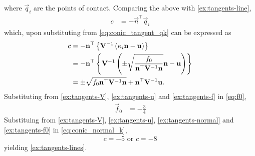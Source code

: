     where $\vec{q}_i$ are the points of contact.  Comparing the above with 
\eqref{ex:tangents-line},
    \begin{align}
	    c &= -\vec{n}^{\top} \vec{q}_i 
	    \label{ex:tangents-c}
    \end{align}
    which, upon substituting from 
\eqref{eq:conic_tangent_qk} can be expressed as 
    \begin{align}
	    c &= -\mathbf{n}^{\top} \left\{
		    \mathbf{V}^{-1}\left(\kappa_i \mathbf{n}-\mathbf{u}\right)\right\}
	    \\
	    &= -\mathbf{n}^{\top} \left\{
		    \mathbf{V}^{-1}\left(
\pm \sqrt{
\frac{
f_0
}
{
\mathbf{n}^{\top}\mathbf{V}^{-1}\mathbf{n}
}
}\mathbf{n}-\mathbf{u}\right)\right\}
\\
	    &=  
\pm \sqrt{
f_0
\mathbf{n}^{\top}\mathbf{V}^{-1}\mathbf{n}
}
+\mathbf{n}^{\top}\mathbf{V}^{-1}\mathbf{u}.
    \end{align}
Substituting from 
	    \eqref{ex:tangents-V},
	    \eqref{ex:tangents-u}
	    and 
	    \eqref{ex:tangents-f}
	    in
      \eqref{eq:f0}, 
    \begin{align}
	    \vec{f}_0 %
	    &=- \frac{3}{4}
	    \label{ex:tangents-f0}
    \end{align}
    Substituing from 
	    \eqref{ex:tangents-V},
	    \eqref{ex:tangents-u},
	    \eqref{ex:tangents-normal}
	    and 
	    \eqref{ex:tangents-f0}
	    in 
	\eqref{eq:conic_normal_k}, 
    \begin{align}
	    c = -5 \text{ or  } c = -8 
	    \label{ex:tangents-ci}
    \end{align}
    yielding 
\eqref{ex:tangents-lines}.
